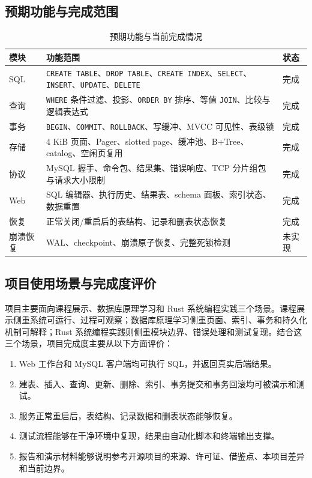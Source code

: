 \documentclass[UTF8,a4paper,12pt]{ctexart}
\newcommand{\code}[1]{\texttt{#1}}
\begin{document}
\subsection{预期功能与完成范围}

\begin{table}[H]
\centering
\caption{预期功能与当前完成情况}
\begin{tabularx}{\textwidth}{p{2.3cm}X p{1.5cm}}
\toprule
模块 & 功能范围 & 状态\\
\midrule
SQL & \code{CREATE TABLE}、\code{DROP TABLE}、\code{CREATE INDEX}、\code{SELECT}、\code{INSERT}、\code{UPDATE}、\code{DELETE} & 完成\\
查询 & \code{WHERE} 条件过滤、投影、\code{ORDER BY} 排序、等值 \code{JOIN}、比较与逻辑表达式 & 完成\\
事务 & \code{BEGIN}、\code{COMMIT}、\code{ROLLBACK}、写缓冲、MVCC 可见性、表级锁 & 完成\\
存储 & 4 KiB 页面、Pager、slotted page、缓冲池、B+Tree、catalog、空闲页复用 & 完成\\
协议 & MySQL 握手、命令包、结果集、错误响应、TCP 分片组包与请求大小限制 & 完成\\
Web & SQL 编辑器、执行历史、结果表、schema 面板、索引状态、数据重置 & 完成\\
恢复 & 正常关闭/重启后的表结构、记录和删表状态恢复 & 完成\\
崩溃恢复 & WAL、checkpoint、崩溃原子恢复、完整死锁检测 & 未实现\\
\bottomrule
\end{tabularx}
\end{table}

\subsection{项目使用场景与完成度评价}

项目主要面向课程展示、数据库原理学习和 Rust 系统编程实践三个场景。课程展示侧重系统可运行、过程可观察；数据库原理学习侧重页面、索引、事务和持久化机制可解释；Rust 系统编程实践则侧重模块边界、错误处理和测试复现。结合这三个场景，项目完成度主要从以下方面评价：

\begin{enumerate}[label=\arabic*.]
\item Web 工作台和 MySQL 客户端均可执行 SQL，并返回真实后端结果。
\item 建表、插入、查询、更新、删除、索引、事务提交和事务回滚均可被演示和测试。
\item 服务正常重启后，表结构、记录数据和删表状态能够恢复。
\item 测试流程能够在干净环境中复现，结果由自动化脚本和终端输出支撑。
\item 报告和演示材料能够说明参考开源项目的来源、许可证、借鉴点、本项目差异和当前边界。
\end{enumerate}
\end{document}

